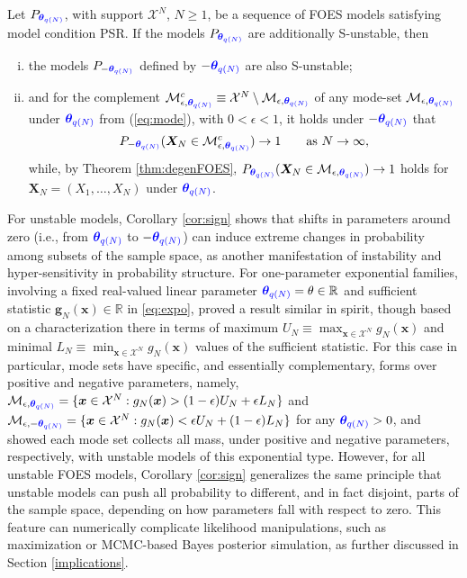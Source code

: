 \documentclass[numbib]{imamat}
\theoremstyle{theorem}
\theoremstyle{lemma}
\theoremstyle{example}
\theoremstyle{corollary}
\theoremstyle{definition}
\theoremstyle{remark}
\theoremstyle{approximation}
\theoremstyle{scheme}
\newcommand{\thetaidx}{q(N)}
\newcommand{\thetaN}{\boldsymbol \theta_{\thetaidx}}
\newcommand{\ak}[1]{{\color{blue} #1}}
\let\BeginKnitrBlock\begin \let\EndKnitrBlock\end
\begin{document}
\BeginKnitrBlock{corollary}
\protect\hypertarget{cor:sign}{}{\label{cor:sign} }Let \(P_{\ak{\thetaN}}\), with support \(\mathcal{X}^N\), \(N\geq 1\), be a sequence of FOES models satisfying model condition PSR. If the models \(P_{\ak{\thetaN}}\) are additionally S-unstable, then
\begin{enumerate}[(i)]
\item the models  $P_{-\ak{\thetaN}}$  defined by $-\ak{\thetaN}$  are also S-unstable;
\item and for the complement $\mathcal{M}_{\epsilon, \ak{\thetaN}}^c \equiv \mathcal{X}^N \setminus \mathcal{M}_{\epsilon, \ak{\thetaN}}$ of any mode-set $\mathcal{M}_{\epsilon, \ak{\thetaN}}$ under $\ak{\thetaN}$ from (\ref{eq:mode}), with $0<\epsilon<1$, it holds under $-\ak{\thetaN}$ that
    $$ 
    P_{-\ak{\thetaN}}( \boldsymbol X_N \in \mathcal{M}_{\epsilon, \ak{\thetaN}}^c) \rightarrow 1\qquad \text{as } N\to \infty,
    $$
    while, by Theorem \ref{thm:degenFOES}, $P_{\ak{\thetaN}}( \boldsymbol X_N \in \mathcal{M}_{\epsilon, \ak{\thetaN}} ) \rightarrow 1$ holds for $\boldsymbol X_N = (X_1,\ldots,X_N)$ under $\ak{\thetaN}$.
\end{enumerate}
\EndKnitrBlock{corollary}

For unstable models, Corollary \ref{cor:sign} shows that shifts in parameters around zero (i.e., from \(\ak{\thetaN}\) to \(-\ak{\thetaN}\)) can induce extreme changes in probability among subsets of the sample space, as another manifestation of instability and hyper-sensitivity in probability structure. For one-parameter exponential families, involving a fixed real-valued linear parameter \(\ak{\thetaN} = \theta \in \mathbb{R}\) and sufficient statistic \(\boldsymbol g_N(\boldsymbol x)\in \mathbb{R}\) in \eqref{eq:expo}, \citet[Theorem 3]{schweinberger2011instability} proved a result similar in spirit, though based on a characterization there in terms of maximum \(U_N \equiv \max_{\boldsymbol x\in\mathcal{X}^N}g_N(\boldsymbol x)\) and minimal \(L_N \equiv \min_{\boldsymbol x\in\mathcal{X}^N}g_N(\boldsymbol x)\) values of the sufficient statistic. For this case in particular, mode sets have specific, and essentially complementary, forms over positive and negative parameters, namely, \(\mathcal{M}_{\epsilon, \ak{\thetaN}} = \{\boldsymbol x \in\mathcal{X}^N: g_N(\boldsymbol x) > (1-\epsilon) U_N + \epsilon L_N \}\) and \(\mathcal{M}_{\epsilon, -\ak{\thetaN}} = \{\boldsymbol x \in\mathcal{X}^N: g_N(\boldsymbol x) < \epsilon U_N + (1-\epsilon) L_N \}\) for any \(\ak{\thetaN}>0\), and
\citet[Theorem 3]{schweinberger2011instability} showed each mode set collects all mass, under positive and negative parameters, respectively, with unstable models of this exponential type. However, for all unstable FOES models, Corollary \ref{cor:sign} generalizes the same principle that unstable models can push all probability to different, and in fact disjoint, parts of the sample space, depending on how parameters fall with respect to zero. This feature can numerically complicate likelihood manipulations, such as maximization or MCMC-based Bayes posterior \ak{simulation}, as further discussed in Section \ref{implications}.
\end{document}

